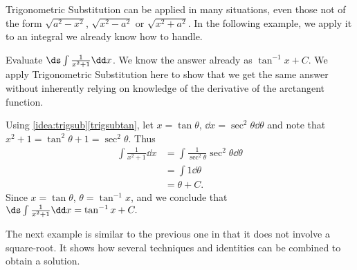 Trigonometric Substitution can be applied in many situations, even those not of the form $\sqrt{a^2-x^2}$, $\sqrt{x^2-a^2}$ or $\sqrt{x^2+a^2}$. In the following example, we apply it to an integral we already know how to handle.

\begin{example}\label{ex_trigsub5}%
Evaluate $\ds \int\frac1{x^2+1}\dd x$.
\solution
We know the answer already as $\tan^{-1}x+C$. We apply Trigonometric Substitution here to show that we get the same answer without inherently relying on knowledge of the derivative of the arctangent function.

Using \autoref{idea:trigsub}\ref*{trigsubtan}, let $x=\tan\theta$, $\dd x=\sec^2\theta\dd\theta$ and note that $x^2+1 = \tan^2\theta+1 = \sec^2\theta$. Thus
\begin{align*}
\int \frac1{x^2+1}\dd x &= \int \frac{1}{\sec^2\theta}\sec^2\theta\dd\theta \\
			&= \int 1\dd\theta\\
			&= \theta + C.
\end{align*}
Since $x=\tan \theta$, $\theta = \tan^{-1}x$, and we conclude that $\ds \int\frac1{x^2+1}\dd x = \tan^{-1}x+C.$
\end{example}

The next example is similar to the previous one in that it does not involve a square-root. It shows how several techniques and identities can be combined to obtain a solution.

